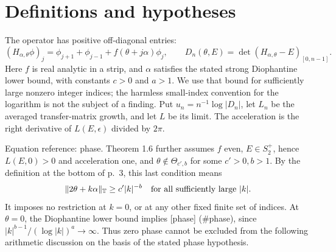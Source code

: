 \documentclass[10pt]{article}
\begin{document}
\section*{Definitions and hypotheses}
The operator has positive off-diagonal entries: \[(H_{\alpha,\theta}\phi)_j=\phi_{j+1}+\phi_{j-1}
 +f(\theta+j\alpha)\phi_j,\qquad
 D_n(\theta,E)=\det(H_{\alpha,\theta}-E)_{[0,n-1]}.\] Here \(f\) is real analytic in a strip, and \(\alpha\) satisfies the stated strong Diophantine lower bound, with constants \(c>0\) and \(a>1\). We use that bound for sufficiently large nonzero integer indices; the harmless small-index convention for the logarithm is not the subject of a finding. Put \(u_n=n^{-1}\log|D_n|\), let \(L_n\) be the averaged transfer-matrix growth, and let \(L\) be its limit. The acceleration is the right derivative of \(L(E,\epsilon)\) divided by \(2\pi\).\par
Equation reference: phase. Theorem 1.6 further assumes \(f\) even, \(E\in S_2^+\), hence \(L(E,0)>0\) and acceleration one, and \(\theta\notin\Theta_{c',b}\) for some \(c'>0,b>1\). By the definition at the bottom of p. 3, this last condition means \[
 \|2\theta+k\alpha\|_{\mathbb T}\ge c'|k|^{-b}
 \quad\hbox{for all sufficiently large }|k|.\] It imposes no restriction at \(k=0\), or at any other fixed finite set of indices. At \(\theta=0\), the Diophantine lower bound implies [phase] (\#phase), since \(|k|^{b-1}/(\log |k|)^a\to\infty\). Thus zero phase cannot be excluded from the following arithmetic discussion on the basis of the stated phase hypothesis.\par
\end{document}
